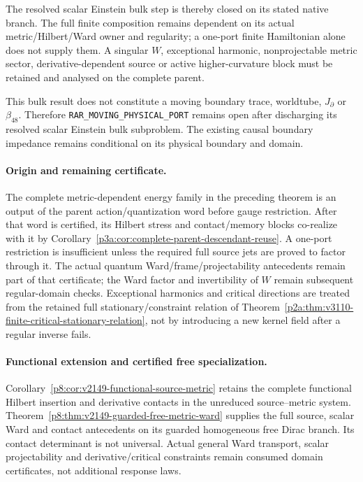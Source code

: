\documentclass[12pt,a4paper]{article}
\begin{document}
The resolved scalar Einstein bulk step is thereby closed on its stated native
branch.  The full finite composition remains dependent on its actual
metric/Hilbert/Ward owner and regularity; a one-port finite Hamiltonian alone
does not supply them.  A singular $W$, exceptional harmonic, nonprojectable
metric sector, derivative-dependent source or active higher-curvature block
must be retained and analysed on the complete parent.

This bulk result does not constitute a moving boundary trace, worldtube,
$J_\partial$ or $\beta_{48}$.  Therefore
\texttt{RAR\_MOVING\_PHYSICAL\_PORT} remains open after discharging its resolved
scalar Einstein bulk subproblem.  The existing causal boundary impedance
remains conditional on its physical boundary and domain.

\paragraph{Origin and remaining certificate.}
The complete metric-dependent energy family in the preceding theorem is an
output of the parent action/quantization word before gauge restriction.
After that word is certified, its Hilbert stress and contact/memory blocks
co-realize with it by
Corollary~\ref{p3a:cor:complete-parent-descendant-reuse}.
A one-port restriction is insufficient unless the required full source jets
are proved to factor through it.  The actual quantum Ward/frame/projectability
antecedents remain part of that certificate; the Ward factor and invertibility
of \(W\) remain subsequent regular-domain checks.
Exceptional harmonics and critical directions are treated from the retained
full stationary/constraint relation of
Theorem~\ref{p2a:thm:v3110-finite-critical-stationary-relation}, not by
introducing a new kernel field after a regular inverse fails.

\paragraph{Functional extension and certified free specialization.}
Corollary~\ref{p8:cor:v2149-functional-source-metric} retains the complete
functional Hilbert insertion and derivative contacts in the unreduced
source--metric system. Theorem~\ref{p8:thm:v2149-guarded-free-metric-ward}
supplies the full source, scalar Ward and contact antecedents on its guarded
homogeneous free Dirac branch. Its contact determinant is not universal.
Actual general Ward transport, scalar projectability and derivative/critical
constraints remain consumed domain certificates, not additional response laws.
\end{document}
